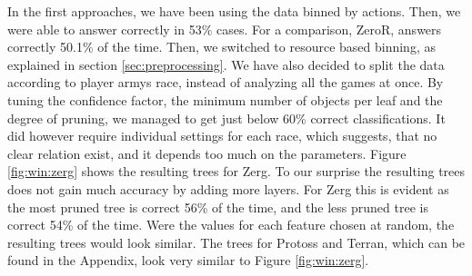 \documentclass[a4paper,11pt]{article}
\begin{document}
In the first approaches, we have been using the data binned by actions. Then, we were able to answer correctly in 53\% cases. For a comparison, ZeroR, answers correctly 50.1\% of the time. Then, we switched to resource based binning, as explained in section \ref{sec:preprocessing}. We have also decided to split the data according to player armys race, instead of analyzing all the games at once. By tuning the confidence factor, the minimum number of objects per leaf and the degree of pruning, we managed to get just below 60\% correct classifications. It did however require individual settings for each race, which suggests, that no clear relation exist, and it depends too much on the parameters.
Figure \ref{fig:win:zerg} shows the resulting trees for Zerg. To our surprise the resulting trees does not gain much accuracy by adding more layers. For Zerg this is evident as the most pruned tree is correct 56\% of the time, and the less pruned tree is correct 54\% of the time. Were the values for each feature chosen at random, the resulting trees would look similar.
The trees for Protoss and Terran, which can be found in the Appendix, look very similar to Figure \ref{fig:win:zerg}. 
\end{document}
